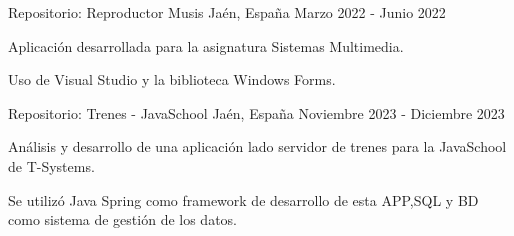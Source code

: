 
\begin{cventries}
    \cventry
      {Repositorio: }
      {Reproductor Musis}
      {Jaén, España}
      {Marzo 2022 - Junio 2022}
      {
        \begin{cvitems} %
          \item {Aplicación desarrollada para la asignatura Sistemas Multimedia.}
          \item {Uso de Visual Studio y la biblioteca Windows Forms.}
        \end{cvitems}
      }
    \vspace{2em} %
    \cventry
      {Repositorio: }
      {Trenes - JavaSchool}
      {Jaén, España}
      {Noviembre 2023 - Diciembre 2023}
      {
        \begin{cvitems} %
          \item {Análisis y desarrollo de una aplicación lado servidor de trenes para la JavaSchool de T-Systems.}
          \item {Se utilizó Java Spring como framework de desarrollo de esta APP,SQL y BD como sistema de gestión de los datos.}
        \end{cvitems}
      }
\end{cventries}